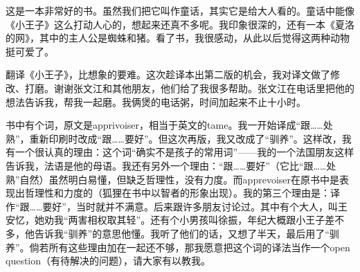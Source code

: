这是一本非常好的书。虽然我们把它叫作童话，其实它是给大人看的。童话中能像《小王子》这么打动人心的，想起来还真不多呢。我印象很深的，还有一本《夏洛的网》，其中的主人公是蜘蛛和猪。看了书，我很感动，从此以后觉得这两种动物挺可爱了。

翻译《小王子》，比想象的要难。这次趁译本出第二版的机会，我对译文做了修改、打磨。谢谢张文江和其他朋友，他们给了我很多帮助。张文江在电话里把他的想法告诉我，帮我一起磨。我俩煲的电话粥，时间加起来不止十小时。

书中有个词，原文是apprivoiser，相当于英文的tame。我一开始译成“跟\ldots{}\ldots{}处熟”，重新印刷时改成“跟\ldots{}\ldots{}要好”。但这次再版，我又改成了“驯养”。这样改，我有一个很认真的理由：这个词“确实不是孩子的常用词”------我的一个法国朋友这样告诉我，法语是他的母语。我还有另外一个理由：“跟\ldots{}\ldots{}要好”（它比“跟\ldots{}\ldots{}处熟”自然）虽然明白易懂，但缺乏哲理性，没有力度。而apprevoiser在原书中是表现出哲理性和力度的（狐狸在书中以智者的形象出现）。我的第三个理由是：译作“跟\ldots{}\ldots{}要好”，当时就并不满意。后来跟许多朋友讨论过。其中有个大人，叫王安忆，她劝我“两害相权取其轻”。还有个小男孩叫徐振，年纪大概跟小王子差不多，他告诉我“驯养”的意思他懂。我听了他们的话，又想了半天，最后用了“驯养”。倘若所有这些理由加在一起还不够，那我愿意把这个词的译法当作一个open
question（有待解决的问题），请大家有以教我。


\stopsubject

\stoptitle%
